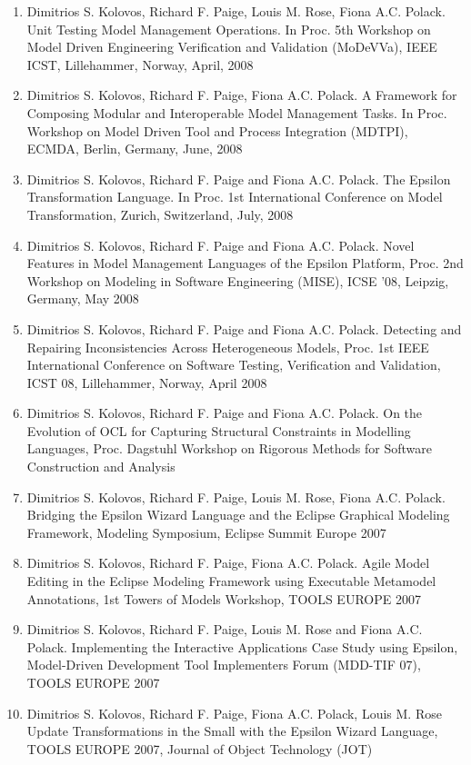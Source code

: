 \begin{enumerate}
	\item Dimitrios S. Kolovos, Richard F. Paige, Louis M. Rose, Fiona A.C. Polack. Unit Testing Model Management Operations. In Proc. 5th Workshop on Model Driven Engineering Verification and Validation (MoDeVVa), IEEE ICST, Lillehammer, Norway, April, 2008
	\item Dimitrios S. Kolovos, Richard F. Paige, Fiona A.C. Polack. A Framework for Composing Modular and Interoperable Model Management Tasks. In Proc. Workshop on Model Driven Tool and Process Integration (MDTPI), ECMDA, Berlin, Germany, June, 2008
	\item Dimitrios S. Kolovos, Richard F. Paige and Fiona A.C. Polack. The Epsilon Transformation Language. In Proc. 1st International Conference on Model Transformation, Zurich, Switzerland, July, 2008
	\item Dimitrios S. Kolovos, Richard F. Paige and Fiona A.C. Polack. Novel Features in Model Management Languages of the Epsilon Platform, Proc. 2nd Workshop on Modeling in Software Engineering (MISE), ICSE '08, Leipzig, Germany, May 2008
	\item Dimitrios S. Kolovos, Richard F. Paige and Fiona A.C. Polack. Detecting and Repairing Inconsistencies Across Heterogeneous Models, Proc. 1st IEEE International Conference on Software Testing, Verification and Validation, ICST 08, Lillehammer, Norway, April 2008
	\item Dimitrios S. Kolovos, Richard F. Paige and Fiona A.C. Polack. On the Evolution of OCL for Capturing Structural Constraints in Modelling Languages, Proc. Dagstuhl Workshop on Rigorous Methods for Software Construction and Analysis
	\item Dimitrios S. Kolovos, Richard F. Paige, Louis M. Rose, Fiona A.C. Polack. Bridging the Epsilon Wizard Language and the Eclipse Graphical Modeling Framework, Modeling Symposium, Eclipse Summit Europe 2007
	\item Dimitrios S. Kolovos, Richard F. Paige, Fiona A.C. Polack. Agile Model Editing in the Eclipse Modeling Framework using Executable Metamodel Annotations, 1st Towers of Models Workshop, TOOLS EUROPE 2007
	\item Dimitrios S. Kolovos, Richard F. Paige, Louis M. Rose and Fiona A.C. Polack. Implementing the Interactive Applications Case Study using Epsilon, Model-Driven Development Tool Implementers Forum (MDD-TIF 07), TOOLS EUROPE 2007
	\item Dimitrios S. Kolovos, Richard F. Paige, Fiona A.C. Polack, Louis M. Rose Update Transformations in the Small with the Epsilon Wizard Language, TOOLS EUROPE 2007, Journal of Object Technology (JOT)

\end{enumerate}
